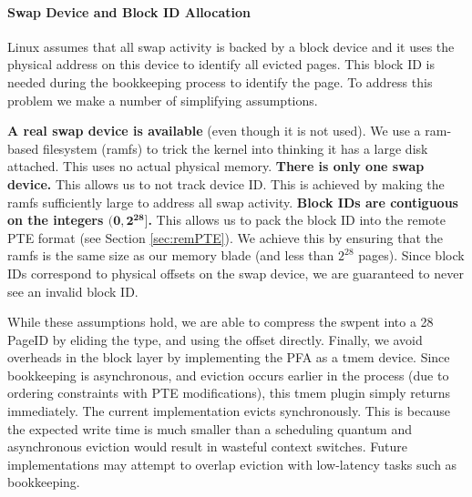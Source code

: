 \paragraph{Swap Device and Block ID Allocation}
Linux assumes that all swap activity is backed by a block device and it uses
the physical address on this device to identify all evicted pages. This block
ID is needed during the bookkeeping process to identify the page. To address
this problem we make a number of simplifying assumptions.

\begin{outline}[enumerate]
	\1 \textbf{A real swap device is available} (even though it is not used). We
		use a ram-based filesystem (ramfs) to trick the kernel into thinking it has
		a large disk attached. This uses no actual physical memory.
	\1 \textbf{There is only one swap device.} This allows us to not track device
		ID. This is achieved by making the ramfs sufficiently large to address all
		swap activity.
	\1 \textbf{Block IDs are contiguous on the integers $\mathbf{(0, 2^{28}]}$.}
		This allows us to pack the block ID into the remote PTE format (see Section
		\ref{sec:remPTE}). We achieve this by ensuring that the ramfs is the same
		size as our memory blade (and less than $2^{28}$ pages). Since block IDs
		correspond to physical offsets on the swap device, we are guaranteed to
		never see an invalid block ID.
\end{outline}

While these assumptions hold, we are able to compress the \gls{swpent} into a
\SI{28}{\bit} PageID by eliding the type, and using the offset directly.
Finally, we avoid overheads in the block layer by implementing the PFA as a
\gls{tmem} device. Since bookkeeping is asynchronous, and eviction occurs
earlier in the process (due to ordering constraints with PTE modifications),
this \gls{tmem} plugin simply returns immediately. The current implementation
evicts synchronously. This is because the expected write time is much smaller
than a scheduling quantum and asynchronous eviction would result in wasteful
context switches. Future implementations may attempt to overlap eviction with
low-latency tasks such as bookkeeping.

